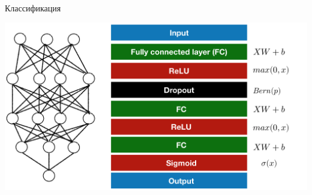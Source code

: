 \documentclass[notes,12pt, aspectratio=169]{beamer}
\begin{document}
\begin{frame}{Классификация}
	\begin{center}
		\includegraphics[width=0.75\paperwidth]{lego_class_two.png}
	\end{center}
\end{frame}
\end{document}
